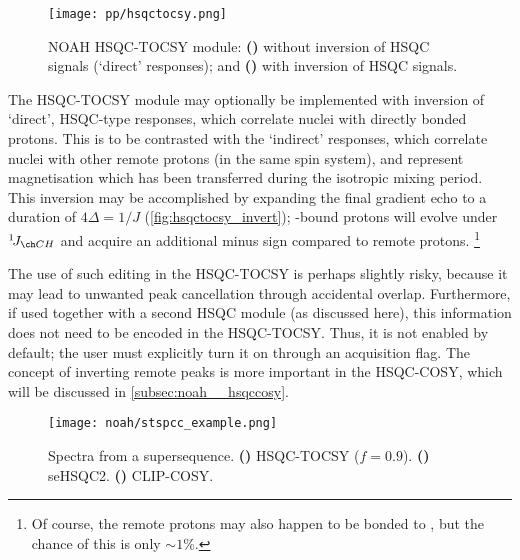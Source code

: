 \begin{figure}[!ht]
    \centering
    \texttt{[image: pp/hsqctocsy.png]}%
    {\label{fig:hsqctocsy_base}}%
    {\label{fig:hsqctocsy_invert}}%
    \caption[NOAH HSQC-TOCSY module]{
        NOAH HSQC-TOCSY module:
        \textbf{()} without inversion of HSQC signals (`direct' responses); and
        \textbf{()} with inversion of HSQC signals.
    }
    \label{fig:hsqctocsy}
\end{figure}

The HSQC-TOCSY module may optionally be implemented with inversion of `direct', HSQC-type responses, which correlate \carbon{} nuclei with directly bonded protons.
This is to be contrasted with the `indirect' responses, which correlate \carbon{} nuclei with other remote protons (in the same spin system), and represent magnetisation which has been transferred during the isotropic mixing period.
This inversion may be accomplished by expanding the final gradient echo to a duration of $4\Delta = 1/J$ (\cref{fig:hsqctocsy_invert}); \carbon{}-bound protons will evolve under $\oneJ{CH}$ and acquire an additional minus sign compared to remote protons.%
\footnote{Of course, the remote protons may also happen to be bonded to \carbon{}, but the chance of this is only $\sim 1\%$.}

The use of such editing in the HSQC-TOCSY is perhaps slightly risky, because it may lead to unwanted peak cancellation through accidental overlap.
Furthermore, if used together with a second HSQC module (as discussed here), this information does not need to be encoded in the HSQC-TOCSY.
Thus, it is not enabled by default; the user must explicitly turn it on through an acquisition flag.
The concept of inverting remote peaks is more important in the HSQC-COSY, which will be discussed in \cref{subsec:noah__hsqccosy}.

\begin{figure}[!ht]
    \centering
    \texttt{[image: noah/stspcc\_example.png]}%
    {\label{fig:stspcc_example_st}}%
    {\label{fig:stspcc_example_sp}}%
    {\label{fig:stspcc_example_cc}}%
    \caption[Spectra from a  supersequence]{
        Spectra from a  supersequence.
        \textbf{()} HSQC-TOCSY ($f = 0.9$).
        \textbf{()} seHSQC2.
        \textbf{()} CLIP-COSY.
    }
    \label{fig:stspcc_example}
\end{figure}


